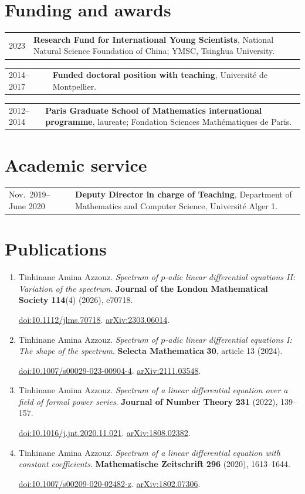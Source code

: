 \documentclass[11pt,a4paper]{article}
\makeatletter
\newcommand{\shortentry}[2]{%
  \begin{tabularx}{\textwidth}{@{}>{\raggedright\arraybackslash}p{32mm}@{\hspace{4mm}}>{\raggedright\arraybackslash}X@{}}\textcolor{muted}{#1} & #2\end{tabularx}\par\vspace{3pt}}
\newcommand{\arxiv}[1]{\href{https://arxiv.org/abs/#1}{arXiv:#1}}
\newcommand{\doi}[1]{\href{https://doi.org/#1}{doi:#1}}
\makeatother
\begin{document}
\section{Funding and awards}
\shortentry{2023}{\textbf{Research Fund for International Young Scientists}, National Natural Science Foundation of China; YMSC, Tsinghua University.}
\shortentry{2014--2017}{\textbf{Funded doctoral position with teaching}, Universit\'e de Montpellier.}
\shortentry{2012--2014}{\textbf{Paris Graduate School of Mathematics international programme}, laureate; Fondation Sciences Math\'ematiques de Paris.}

\section{Academic service}
\shortentry{Nov.\ 2019--June 2020}{\textbf{Deputy Director in charge of Teaching}, Department of Mathematics and Computer Science, Universit\'e Alger 1.}

\newpage
\section{Publications}
\begin{enumerate}
\item Tinhinane Amina Azzouz. \emph{Spectrum of $p$-adic linear differential equations II: Variation of the spectrum}. \textbf{Journal of the London Mathematical Society} \textbf{114}(4) (2026), e70718.\par
\doi{10.1112/jlms.70718}. \arxiv{2303.06014}.
\item Tinhinane Amina Azzouz. \emph{Spectrum of $p$-adic linear differential equations I: The shape of the spectrum}. \textbf{Selecta Mathematica} \textbf{30}, article 13 (2024).\par
\doi{10.1007/s00029-023-00904-4}. \arxiv{2111.03548}.
\item Tinhinane Amina Azzouz. \emph{Spectrum of a linear differential equation over a field of formal power series}. \textbf{Journal of Number Theory} \textbf{231} (2022), 139--157.\par
\doi{10.1016/j.jnt.2020.11.021}. \arxiv{1808.02382}.
\item Tinhinane Amina Azzouz. \emph{Spectrum of a linear differential equation with constant coefficients}. \textbf{Mathematische Zeitschrift} \textbf{296} (2020), 1613--1644.\par
\doi{10.1007/s00209-020-02482-z}. \arxiv{1802.07306}.
\end{enumerate}
\end{document}
